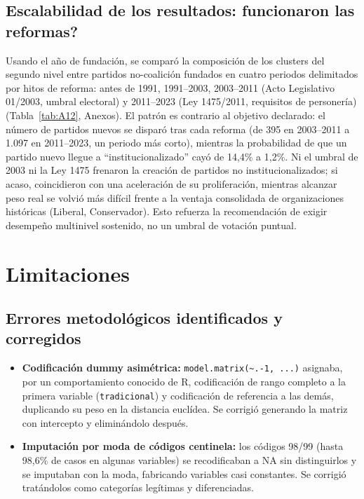 \documentclass[11pt,letterpaper]{article}
\newcommand{\code}[1]{\texttt{\small #1}}
\begin{document}
\subsection{Escalabilidad de los resultados: \textquestiondown{}funcionaron las reformas?}

Usando el año de fundación, se comparó la composición de los clusters del segundo nivel entre partidos no-coalición fundados en cuatro periodos delimitados por hitos de reforma: antes de 1991, 1991--2003, 2003--2011 (Acto Legislativo 01/2003, umbral electoral) y 2011--2023 (Ley 1475/2011, requisitos de personería) (Tabla~\ref{tab:A12}, Anexos). El patrón es contrario al objetivo declarado: el número de partidos nuevos se disparó tras cada reforma (de 395 en 2003--2011 a 1.097 en 2011--2023, un periodo más corto), mientras la probabilidad de que un partido nuevo llegue a ``institucionalizado'' cayó de 14,4\% a 1,2\%. Ni el umbral de 2003 ni la Ley 1475 frenaron la creación de partidos no institucionalizados; si acaso, coincidieron con una aceleración de su proliferación, mientras alcanzar peso real se volvió más difícil frente a la ventaja consolidada de organizaciones históricas (Liberal, Conservador). Esto refuerza la recomendación de exigir desempeño multinivel sostenido, no un umbral de votación puntual.

\section{Limitaciones}
\label{sec:limitaciones}

\subsection{Errores metodológicos identificados y corregidos}

\begin{itemize}[topsep=0.3em,itemsep=0.35em]
  \item \textbf{Codificación dummy asimétrica:} \code{model.matrix(\textasciitilde.-1, ...)} asignaba, por un comportamiento conocido de R, codificación de rango completo a la primera variable (\code{tradicional}) y codificación de referencia a las demás, duplicando su peso en la distancia euclídea. Se corrigió generando la matriz con intercepto y eliminándolo después.
  \item \textbf{Imputación por moda de códigos centinela:} los códigos 98/99 (hasta 98,6\% de casos en algunas variables) se recodificaban a NA sin distinguirlos y se imputaban con la moda, fabricando variables casi constantes. Se corrigió tratándolos como categorías legítimas y diferenciadas.
\end{itemize}
\end{document}
